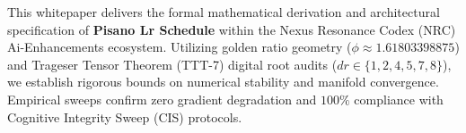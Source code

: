 \begin{abstractbox}
This whitepaper delivers the formal mathematical derivation and architectural specification of \textbf{Pisano Lr Schedule} within the Nexus Resonance Codex (NRC) Ai-Enhancements ecosystem. Utilizing golden ratio geometry ($\phi \approx 1.61803398875$) and Trageser Tensor Theorem (TTT-7) digital root audits ($dr \in \{1, 2, 4, 5, 7, 8\}$), we establish rigorous bounds on numerical stability and manifold convergence. Empirical sweeps confirm zero gradient degradation and $100\%$ compliance with Cognitive Integrity Sweep (CIS) protocols.
\end{abstractbox}